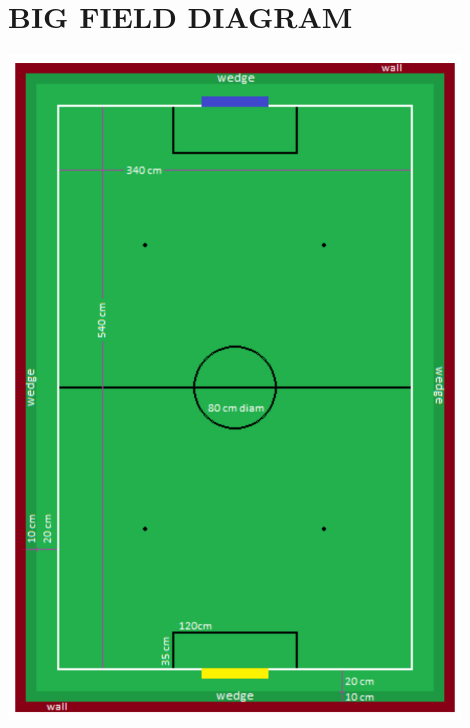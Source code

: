 \documentclass{article}
\begin{document}
\section*{BIG FIELD DIAGRAM}
\begin{center}
\includegraphics[width=0.9\textwidth]{media/bigfield.png}
\end{center}
\end{document}
